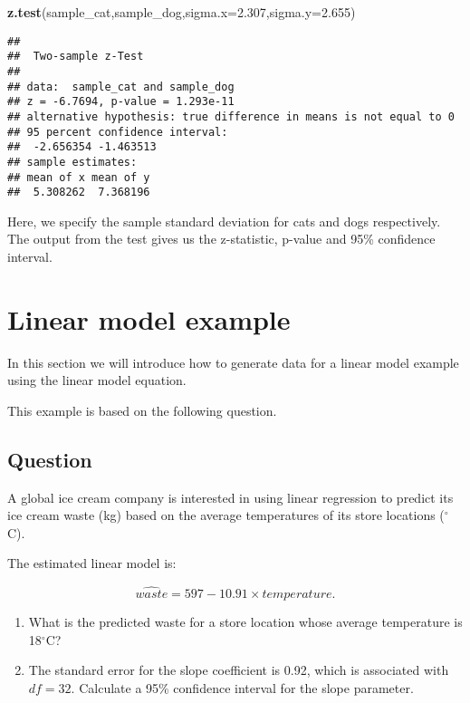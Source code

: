 \documentclass[
]{book}
\newenvironment{Shaded}{\begin{snugshade}}{\end{snugshade}}
\newcommand{\DataTypeTok}[1]{\textcolor[rgb]{0.13,0.29,0.53}{#1}}
\newcommand{\FloatTok}[1]{\textcolor[rgb]{0.00,0.00,0.81}{#1}}
\newcommand{\KeywordTok}[1]{\textcolor[rgb]{0.13,0.29,0.53}{\textbf{#1}}}
\newcommand{\NormalTok}[1]{#1}
\begin{document}
\begin{Shaded}
\begin{Highlighting}[]
\KeywordTok{z.test}\NormalTok{(sample_cat,sample_dog,}\DataTypeTok{sigma.x=}\FloatTok{2.307}\NormalTok{,}\DataTypeTok{sigma.y=}\FloatTok{2.655}\NormalTok{)}
\end{Highlighting}
\end{Shaded}

\begin{verbatim}
## 
##  Two-sample z-Test
## 
## data:  sample_cat and sample_dog
## z = -6.7694, p-value = 1.293e-11
## alternative hypothesis: true difference in means is not equal to 0
## 95 percent confidence interval:
##  -2.656354 -1.463513
## sample estimates:
## mean of x mean of y 
##  5.308262  7.368196
\end{verbatim}

Here, we specify the sample standard deviation for cats and dogs respectively. The output from the test gives us the z-statistic, p-value and 95\% confidence interval.

\hypertarget{linear-model-example}{%
\chapter{Linear model example}\label{linear-model-example}}

In this section we will introduce how to generate data for a linear model example using the linear model equation.

This example is based on the following question.

\hypertarget{question}{%
\section{Question}\label{question}}

A global ice cream company is interested in using linear regression to predict its ice cream waste (kg) based on the average temperatures of its store locations (\(^{\circ}\)C).

The estimated linear model is:

\[\hat{waste} = 597 - 10.91 \times temperature.\]

\begin{enumerate}
\def\labelenumi{\arabic{enumi}.}
\item
  What is the predicted waste for a store location whose average temperature is 18\(^{\circ}\)C?
\item
  The standard error for the slope coefficient is 0.92, which is associated with \(df=32\). Calculate a 95\% confidence interval for the slope parameter.
\end{enumerate}
\end{document}

